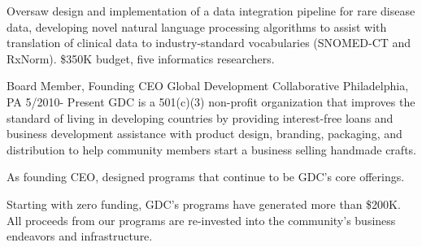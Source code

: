 \begin{cventries}
{\begin{cvitems}
               \item {Oversaw design and implementation of a data integration pipeline for rare disease data, developing novel natural language processing algorithms to assist with translation of clinical data to industry-standard vocabularies (SNOMED-CT and RxNorm). \$350K budget, five informatics researchers.}
             \end{cvitems}
    }
  \cvexperience
    {Board Member, Founding CEO}
    {Global Development Collaborative}
    {Philadelphia, PA}
    {5/2010- Present}
    {GDC is a 501(c)(3) non-profit organization that improves the standard of living in developing countries by providing interest-free loans and business development assistance with product design, branding, packaging, and distribution to help community members start a business selling handmade crafts.}
    {
      \begin{cvitems}
              \item {As founding CEO, designed programs that continue to be GDC's core offerings.}
               \item {Starting with zero funding, GDC's programs have generated more than \$200K. All proceeds from our programs are re-invested into the community's business endeavors and infrastructure.}
             \end{cvitems}
    }

\end{cventries}
